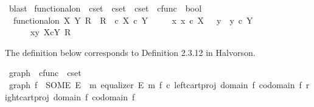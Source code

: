 \begin{isabellebody}
\ blast\isanewline
{}\isamarkupfalse%
%
\endisatagproof
{\isafoldproof}%
%
\isadelimproof
%
\endisadelimproof
%
\isadelimdocument
%
\endisadelimdocument
%
\isatagdocument
%
\isamarkuptrue%
%
\endisatagdocument
{\isafolddocument}%
%
\isadelimdocument
%
\endisadelimdocument
{}\isamarkupfalse%
\ functional{\isacharunderscore}{\kern0pt}on\ {\isacharcolon}{\kern0pt}{\isacharcolon}{\kern0pt}\ {\isachardoublequoteopen}cset\ {\isasymRightarrow}\ cset\ {\isasymRightarrow}\ cset\ {\isasymtimes}\ cfunc\ {\isasymRightarrow}\ bool{\isachardoublequoteclose}\ \isanewline
\ \ {\isachardoublequoteopen}functional{\isacharunderscore}{\kern0pt}on\ X\ Y\ R\ {\isacharequal}{\kern0pt}\ {\isacharparenleft}{\kern0pt}R\ \ {\isasymsubseteq}\isactrlsub c\ X\ {\isasymtimes}\isactrlsub c\ Y\ {\isasymand}\isanewline
\ \ \ \ {\isacharparenleft}{\kern0pt}{\isasymforall}x{\isachardot}{\kern0pt}\ x\ {\isasymin}\isactrlsub c\ X\ {\isasymlongrightarrow}\ {\isacharparenleft}{\kern0pt}{\isasymexists}{\isacharbang}{\kern0pt}\ y{\isachardot}{\kern0pt}\ \ y\ {\isasymin}\isactrlsub c\ Y\ {\isasymand}\ \ \isanewline
\ \ \ \ \ \ {\isasymlangle}x{\isacharcomma}{\kern0pt}y{\isasymrangle}\ {\isasymin}\isactrlbsub X{\isasymtimes}\isactrlsub cY\isactrlesub \ R{\isacharparenright}{\kern0pt}{\isacharparenright}{\kern0pt}{\isacharparenright}{\kern0pt}{\isachardoublequoteclose}%
\begin{isamarkuptext}%
The definition below corresponds to Definition 2.3.12 in Halvorson.%
\end{isamarkuptext}\isamarkuptrue%
\isamarkupfalse%
\ graph\ {\isacharcolon}{\kern0pt}{\isacharcolon}{\kern0pt}\ {\isachardoublequoteopen}cfunc\ {\isasymRightarrow}\ cset{\isachardoublequoteclose}\ \isanewline
\ {\isachardoublequoteopen}graph\ f\ {\isacharequal}{\kern0pt}\ {\isacharparenleft}{\kern0pt}SOME\ E{\isachardot}{\kern0pt}\ {\isasymexists}\ m{\isachardot}{\kern0pt}\ equalizer\ E\ m\ {\isacharparenleft}{\kern0pt}f\ {\isasymcirc}\isactrlsub c\ left{\isacharunderscore}{\kern0pt}cart{\isacharunderscore}{\kern0pt}proj\ {\isacharparenleft}{\kern0pt}domain\ f{\isacharparenright}{\kern0pt}\ {\isacharparenleft}{\kern0pt}codomain\ f{\isacharparenright}{\kern0pt}{\isacharparenright}{\kern0pt}\ {\isacharparenleft}{\kern0pt}right{\isacharunderscore}{\kern0pt}cart{\isacharunderscore}{\kern0pt}proj\ {\isacharparenleft}{\kern0pt}domain\ f{\isacharparenright}{\kern0pt}\ {\isacharparenleft}{\kern0pt}codomain\ f{\isacharparenright}{\kern0pt}{\isacharparenright}{\kern0pt}{\isacharparenright}{\kern0pt}{\isachardoublequoteclose}\isanewline

\end{isabellebody}
